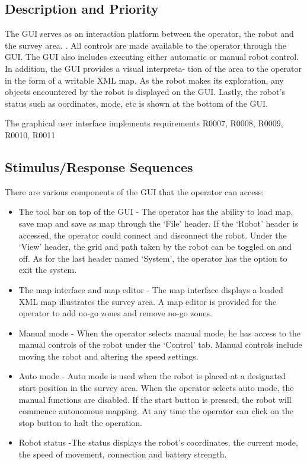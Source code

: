 \subsection {Description and Priority}
The GUI serves as an interaction platform between the operator, the robot and the survey area.
. All controls are made available to the operator through the GUI. The GUI also includes executing
either automatic or manual robot control. In addition, the GUI provides a visual interpreta-
tion of the area to the operator in the form of a writable XML map. As the robot
makes its exploration, any objects encountered by the robot is displayed on the GUI. Lastly, the robot's status such as
 oordinates, mode, etc is shown at the bottom of the GUI.

The graphical user interface implements requirements R0007, R0008, R0009, R0010, R0011

\subsection{Stimulus/Response Sequences}

There are various components of the GUI that the operator can access:

\begin{itemize}
	\item The tool bar on top of the GUI - The operator has the ability to load map, save map and save as
	map through the `File' header. If the `Robot' header is accessed, the operator could connect and disconnect
	the robot. Under the `View' header, the grid and path taken by the robot can be toggled on and
	off. As for the last header named `System', the operator has the option to exit the system.
	\item The map interface and map editor - The map interface displays a loaded XML map illustrates the survey area. A map editor is provided for the operator to
	add no-go zones and remove no-go zones. 
	\item Manual mode - When the operator selects manual mode, he has access to the manual controls of
	the robot under the `Control' tab. Manual controls include moving the robot and altering the speed
	settings. 
	\item  Auto mode - Auto mode is used when the robot is placed at a designated start position in the
	survey area. When the operator selects auto mode, the manual functions are disabled. If the start button is
	pressed, the robot will commence autonomous mapping. At any time the operator can click
	on the stop button to halt the operation. 
	\item Robot status -The status displays the robot's coordinates, the current
	mode, the speed of movement, connection and battery strength.
\end{itemize}
